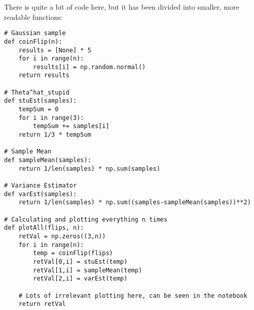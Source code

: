 There is quite a bit of code here, but it has been divided into smaller, more readable functions:
\begin{verbatim}
# Gaussian sample
def coinFlip(n):
    results = [None] * 5
    for i in range(n):
        results[i] = np.random.normal()
    return results

# Theta^hat_stupid
def stuEst(samples):
    tempSum = 0
    for i in range(3):
        tempSum += samples[i]
    return 1/3 * tempSum

# Sample Mean
def sampleMean(samples):
    return 1/len(samples) * np.sum(samples)

# Variance Estimator
def varEst(samples):
    return 1/len(samples) * np.sum((samples-sampleMean(samples))**2)

# Calculating and plotting everything n times
def plotAll(flips, n):
    retVal = np.zeros((3,n))
    for i in range(n):
        temp = coinFlip(flips)
        retVal[0,i] = stuEst(temp)
        retVal[1,i] = sampleMean(temp)
        retVal[2,i] = varEst(temp)
    
    # Lots of irrelevant plotting here, can be seen in the notebook
    return retVal
\end{verbatim}